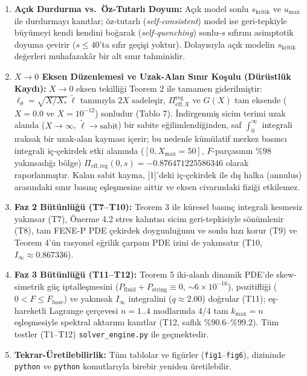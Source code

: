\documentclass[12pt,a4paper]{article}
\begin{document}
\begin{enumerate}
    \item \textbf{Açık Durdurma vs.\ Öz-Tutarlı Doyum:} Açık model sonlu $s_{\mathrm{kritik}}$ ve $u_{\max}$ ile durdurmayı kanıtlar; öz-tutarlı (\textit{self-consistent}) model ise geri-tepkiyle büyümeyi kendi kendini boğarak (\textit{self-quenching}) sonlu-$s$ sıfırını asimptotik doyuma çevirir ($s \le 40$'ta sıfır geçişi yoktur). Dolayısıyla açık modelin $s_{\mathrm{kritik}}$ değerleri muhafazakâr bir alt sınır tahminidir.
    \item \textbf{$X \to 0$ Eksen Düzenlemesi ve Uzak-Alan Sınır Koşulu (Dürüstlük Kaydı):} $X \to 0$ eksen tekilliği Teorem 2 ile tamamen giderilmiştir: $\ell_\theta = \sqrt{X/X_*}\,\tilde{\ell}$ tanımıyla $2X$ sadeleşir, $\Pi_{\mathrm{eff}, X}^{\mathrm{reg}}$ ve $G(X)$ tam eksende ($X=0.0$ ve $X=10^{-12}$) sonludur (Tablo 7). İndirgenmiş sicim terimi uzak alanda ($X \to \infty$, $\tilde{\ell} \to \text{sabit}$) bir sabite eğilimlendiğinden, saf $\int_0^\infty$ integrali ıraksak bir uzak-alan kayması içerir; bu nedenle kümülatif merkez basıncı integrali iç-çekirdek etki alanında ($[0, X_{\max}=50]$, $F$-parçasının $\%98$ yakınsadığı bölge) $\Pi_{\mathrm{eff,reg}}(0,s) = -0.876471225586346$ olarak raporlanmıştır. Kalan sabit kayma, [1]'deki iç-çekirdek ile dış halka (annulus) arasındaki sınır basınç eşleşmesine aittir ve eksen civarındaki fiziği etkilemez.
    \item \textbf{Faz 2 Bütünlüğü (T7--T10):} Teorem 3 ile küresel basınç integrali kesmesiz yakınsar (T7), Önerme 4.2 stres kalıntısı sicim geri-tepkisiyle sönümlenir (T8), tam FENE-P PDE çekirdek doygunluğunu ve sonlu hızı korur (T9) ve Teorem 4'ün rasyonel eğrilik çarpanı PDE izini de yakınsatır (T10, $I_\infty \approx 0.867336$).
    \item \textbf{Faz 3 Bütünlüğü (T11--T12):} Teorem 5 iki-alanlı dinamik PDE'de skew-simetrik güç iptalleşmesini ($P_{\mathrm{fluid}} + P_{\mathrm{string}} \equiv 0$, $\sim 6 \times 10^{-16}$), pozitifliği ($0 < F \le F_{\mathrm{base}}$) ve yakınsak $I_\infty$ integralini ($q \approx 2.00$) doğrular (T11); eş-hareketli Lagrange çerçevesi $n = 1..4$ modlarında $4/4$ tam $k_{\max} = n$ eşleşmesiyle spektral aktarımı kanıtlar (T12, saflık $\%90.6\text{--}\%99.2$). Tüm testler (T1--T12) \texttt{solver\_engine.py} ile geçmektedir.
    \item \textbf{Tekrar-Üretilebilirlik:} Tüm tablolar ve figürler (\texttt{fig1}--\texttt{fig6}),  dizininde \texttt{python}  ve \texttt{python}  komutlarıyla birebir yeniden üretilebilir.
\end{enumerate}
\end{document}
